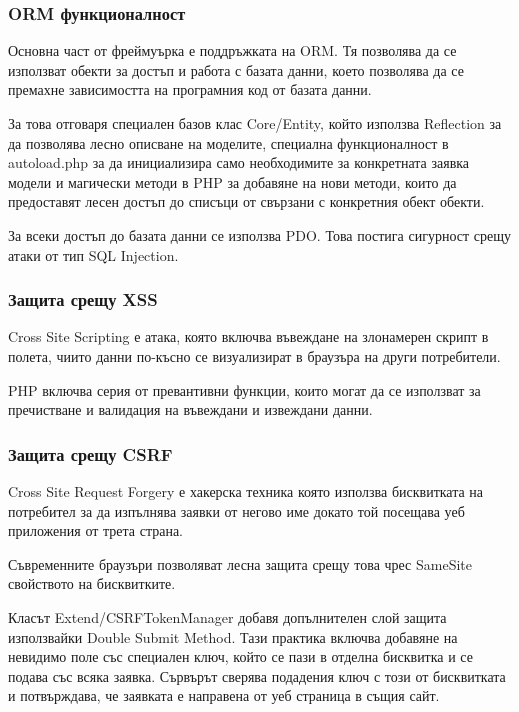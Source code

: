 \subsubsection{ORM функционалност}

Основна част от фреймуърка е поддръжката на ORM.
Тя позволява да се използват обекти за достъп и работа
с базата данни, което позволява да се премахне
зависимостта на програмния код от базата данни.

За това отговаря специален базов клас Core/Entity,
който използва Reflection за да позволява лесно описване
на моделите, специална функционалност в autoload.php за
да инициализира само необходимите за конкретната заявка
модели и магически методи в PHP за добавяне на нови
методи, които да предоставят лесен достъп до списъци от
свързани с конкретния обект обекти.

За всеки достъп до базата данни се използва PDO. Това
постига сигурност срещу атаки от тип SQL Injection.


\subsubsection{Защита срещу XSS}

Cross Site Scripting е атака, която включва въвеждане на
злонамерен скрипт в полета, чиито данни по-късно се
визуализират в браузъра на други потребители.

PHP включва серия от превантивни функции, които могат
да се използват за пречистване и валидация на въвеждани
и извеждани данни.


\subsubsection{Защита срещу CSRF}

Cross Site Request Forgery е хакерска техника която
използва бисквитката на потребител за да изпълнява
заявки от негово име докато той посещава уеб приложения
от трета страна.

Съвременните браузъри позволяват лесна защита срещу това
чрес SameSite свойството на бисквитките.

Класът Extend/CSRFTokenManager добавя допълнителен слой
защита използвайки Double Submit Method. Тази практика
включва добавяне на невидимо поле със специален ключ,
който се пази в отделна бисквитка и се подава със всяка
заявка. Сървърът сверява подадения ключ с този от
бисквитката и потвърждава, че заявката е направена от
уеб страница в същия сайт.

